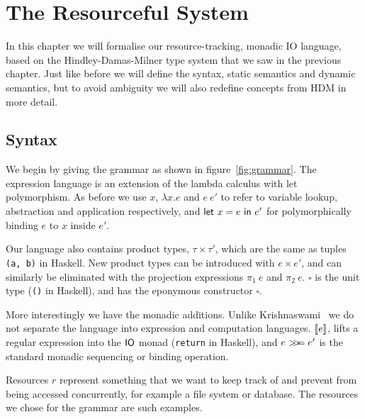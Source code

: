\chapter{The Resourceful System}\label{chapter:system}

In this chapter we will formalise our resource-tracking, monadic IO
language, based on the Hindley-Damas-Milner type system that we saw
in the previous chapter. Just like before we will define the syntax,
static semantics and dynamic semantics, but to avoid ambiguity we will
also redefine concepts from HDM in more detail.

\section{Syntax}

\setlength{\grammarparsep}{20pt plus 1pt minus 1pt} %
\setlength{\grammarindent}{12em} %
\renewcommand{\syntleft}{}
\renewcommand{\syntright}{}


\def\defaultHypSeparation{\hskip .05in}

We begin by giving the grammar as shown in
figure~\ref{fig:grammar}. The expression language is an extension of
the lambda calculus with let polymorphism. As before we use $x$,
$\lambda x . e$ and $e \ e'$ to refer to variable lookup, abstraction and
application respectively, and $\mathsf{let} \ x = e \ \mathsf{in} \ e'$ for polymorphically
binding $e$ to $x$ inside $e'$.

Our language also contains product types, $\tau \times \tau'$, which are the same
as tuples \texttt{(a, b)} in Haskell. New product types can be
introduced with $e \times e'$, and can similarly be eliminated with the
projection expressions $\pi_1 \ e$ and $\pi_2 \ e$. $\square$ is the unit type
(\texttt{()} in Haskell), and has the eponymous
constructor $\square$.

More interestingly we have the monadic additions. Unlike
Krishnaswami~\cite{krishnaswami2006} we do not separate the language
into expression and computation languages. $[\![ e]\!]$, lifts a regular
expression into the $\mathsf{IO}$ monad (\texttt{return} in
Haskell), and $e >\!\!>\!\!= e'$ is the standard monadic sequencing or
binding operation.

Resources $r$ represent something that we want to keep track of and
prevent from being accessed concurrently, for example a file system or
database. The resources we chose for the grammar are such examples.

